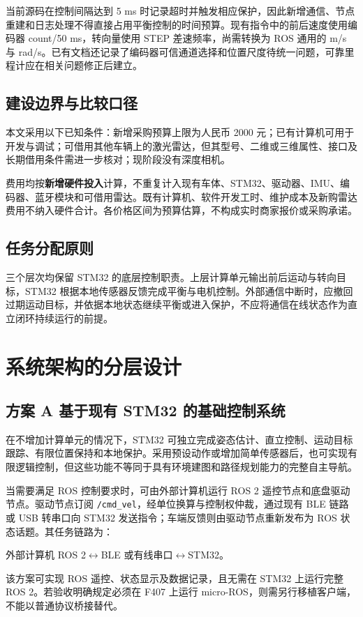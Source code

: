 \documentclass[UTF8,fontset=none,a4paper,11pt]{ctexart}
\newcommand{\code}[1]{\texttt{#1}}
\begin{document}
当前源码在控制间隔达到 5 ms 时记录超时并触发相应保护，因此新增通信、节点重建和日志处理不得直接占用平衡控制的时间预算。现有指令中的前后速度使用编码器 count/50 ms，转向量使用 STEP 差速频率，尚需转换为 ROS 通用的 m/s 与 rad/s。已有文档还记录了编码器可信通道选择和位置尺度待统一问题，可靠里程计应在相关问题修正后建立\cite{project_docs}。

\subsection{建设边界与比较口径}
本文采用以下已知条件：新增采购预算上限为人民币 2000 元；已有计算机可用于开发与调试；可借用其他车辆上的激光雷达，但其型号、二维或三维属性、接口及长期借用条件需进一步核对；现阶段没有深度相机。

费用均按\textbf{新增硬件投入}计算，不重复计入现有车体、STM32、驱动器、IMU、编码器、蓝牙模块和可借用雷达。既有计算机、软件开发工时、维护成本及新购雷达费用不纳入硬件合计。各价格区间为预算估算，不构成实时商家报价或采购承诺。

\subsection{任务分配原则}
三个层次均保留 STM32 的底层控制职责。上层计算单元输出前后运动与转向目标，STM32 根据本地传感器反馈完成平衡与电机控制。外部通信中断时，应撤回过期运动目标，并依据本地状态继续平衡或进入保护，不应将通信在线状态作为直立闭环持续运行的前提。

\section{系统架构的分层设计}
\subsection{方案 A 基于现有 STM32 的基础控制系统}
在不增加计算单元的情况下，STM32 可独立完成姿态估计、直立控制、运动目标跟踪、有限位置保持和本地保护。采用预设动作或增加简单传感器后，也可实现有限逻辑控制，但这些功能不等同于具有环境建图和路径规划能力的完整自主导航。

当需要满足 ROS 控制要求时，可由外部计算机运行 ROS 2 遥控节点和底盘驱动节点。驱动节点订阅 \code{/cmd\_vel}，经单位换算与控制权仲裁，通过现有 BLE 链路或 USB 转串口向 STM32 发送指令；车端反馈则由驱动节点重新发布为 ROS 状态话题。其任务链路为：
\begin{center}
外部计算机 ROS 2\quad$\longleftrightarrow$\quad BLE 或有线串口\quad$\longleftrightarrow$\quad STM32。
\end{center}
该方案可实现 ROS 遥控、状态显示及数据记录，且无需在 STM32 上运行完整 ROS 2。若验收明确规定必须在 F407 上运行 micro-ROS，则需另行移植客户端，不能以普通协议桥接替代。
\end{document}
